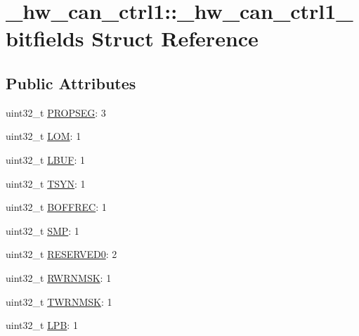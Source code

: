 \hypertarget{struct__hw__can__ctrl1_1_1__hw__can__ctrl1__bitfields}{}\section{\+\_\+hw\+\_\+can\+\_\+ctrl1\+:\+:\+\_\+hw\+\_\+can\+\_\+ctrl1\+\_\+bitfields Struct Reference}
\label{struct__hw__can__ctrl1_1_1__hw__can__ctrl1__bitfields}
\subsection*{Public Attributes}
\begin{DoxyCompactItemize}
\item 
uint32\+\_\+t \hyperlink{struct__hw__can__ctrl1_1_1__hw__can__ctrl1__bitfields_a83b036386765c5f663ff5a825d7a4bde}{P\+R\+O\+P\+S\+EG}\+: 3
\item 
uint32\+\_\+t \hyperlink{struct__hw__can__ctrl1_1_1__hw__can__ctrl1__bitfields_a921bc864d8e4a68f560093c05ab65d91}{L\+OM}\+: 1
\item 
uint32\+\_\+t \hyperlink{struct__hw__can__ctrl1_1_1__hw__can__ctrl1__bitfields_ac2f4057ed33b7594e246c0d580099a67}{L\+B\+UF}\+: 1
\item 
uint32\+\_\+t \hyperlink{struct__hw__can__ctrl1_1_1__hw__can__ctrl1__bitfields_aed38b1f5b215ff9ebfa250c648baa0e0}{T\+S\+YN}\+: 1
\item 
uint32\+\_\+t \hyperlink{struct__hw__can__ctrl1_1_1__hw__can__ctrl1__bitfields_a2a43c9e39fabdfe7835cb2412cf48da9}{B\+O\+F\+F\+R\+EC}\+: 1
\item 
uint32\+\_\+t \hyperlink{struct__hw__can__ctrl1_1_1__hw__can__ctrl1__bitfields_ad6888cdb104927ff41bb4ebb6a01d53f}{S\+MP}\+: 1
\item 
uint32\+\_\+t \hyperlink{struct__hw__can__ctrl1_1_1__hw__can__ctrl1__bitfields_a9e69e06da0709481e69172d2f5b6b542}{R\+E\+S\+E\+R\+V\+E\+D0}\+: 2
\item 
uint32\+\_\+t \hyperlink{struct__hw__can__ctrl1_1_1__hw__can__ctrl1__bitfields_a37736e3065f9a2cdf8253814b09261de}{R\+W\+R\+N\+M\+SK}\+: 1
\item 
uint32\+\_\+t \hyperlink{struct__hw__can__ctrl1_1_1__hw__can__ctrl1__bitfields_a49e077dc6d5ee68d8c99434b84ec6ff6}{T\+W\+R\+N\+M\+SK}\+: 1
\item 
uint32\+\_\+t \hyperlink{struct__hw__can__ctrl1_1_1__hw__can__ctrl1__bitfields_a1e09b63545986b662a051c07c0d51cf8}{L\+PB}\+: 1

\end{DoxyCompactItemize}

